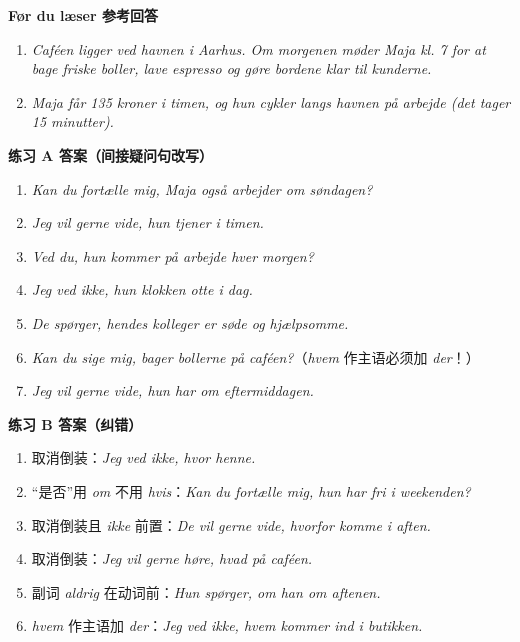 \begin{answerbox}
\textbf{Før du læser 参考回答}
\begin{enumerate}
  \item \textit{Caféen ligger ved havnen i Aarhus. Om morgenen møder Maja kl. 7 for at bage friske boller, lave espresso og gøre bordene klar til kunderne.}
  \item \textit{Maja får 135 kroner i timen, og hun cykler langs havnen på arbejde (det tager 15 minutter).}
\end{enumerate}

\textbf{练习 A 答案（间接疑问句改写）}
\begin{enumerate}
  \item \textit{Kan du fortælle mig,  Maja også arbejder om søndagen?}
  \item \textit{Jeg vil gerne vide,  hun tjener i timen.}
  \item \textit{Ved du,  hun kommer på arbejde hver morgen?}
  \item \textit{Jeg ved ikke,  hun  klokken otte i dag.}
  \item \textit{De spørger,  hendes kolleger er søde og hjælpsomme.}
  \item \textit{Kan du sige mig,  bager bollerne på caféen?}（\textit{hvem} 作主语必须加 \textit{der}！）
  \item \textit{Jeg vil gerne vide,  hun har om eftermiddagen.}
\end{enumerate}

\textbf{练习 B 答案（纠错）}
\begin{enumerate}
  \item 取消倒装：\textit{Jeg ved ikke, hvor  henne.}
  \item “是否”用 \textit{om} 不用 \textit{hvis}：\textit{Kan du fortælle mig,  hun har fri i weekenden?}
  \item 取消倒装且 \textit{ikke} 前置：\textit{De vil gerne vide, hvorfor  komme i aften.}
  \item 取消倒装：\textit{Jeg vil gerne høre, hvad  på caféen.}
  \item 副词 \textit{aldrig} 在动词前：\textit{Hun spørger, om han  om aftenen.}
  \item \textit{hvem} 作主语加 \textit{der}：\textit{Jeg ved ikke, hvem  kommer ind i butikken.}
\end{enumerate}


\end{answerbox}

